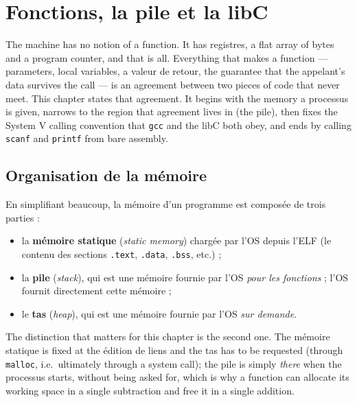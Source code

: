 \section{Fonctions, la pile et la libC}
The machine has no notion of a function. It has registres, a flat array of bytes
and a program counter, and that is all. Everything that makes a function ---
parameters, local variables, a valeur de retour, the guarantee that the
appelant's data survives the call --- is an agreement between two pieces of code
that never meet. This chapter states that agreement. It begins with the memory a
processus is given, narrows to the region that agreement lives in (the pile),
then fixes the System V calling convention that \texttt{gcc} and the libC both
obey, and ends by calling \texttt{scanf} and \texttt{printf} from bare assembly.

\subsection{Organisation de la mémoire}
\begin{definition}
  En simplifiant beaucoup, la mémoire d'un programme est composée de trois
  parties :
  \begin{itemize}
    \item la \textbf{mémoire statique} (\textit{static memory}) chargée par l'OS
      depuis l'ELF (le contenu des sections \texttt{.text}, \texttt{.data},
      \texttt{.bss}, etc.) ;
    \item la \textbf{pile} (\textit{stack}), qui est une mémoire fournie par
      l'OS \emph{pour les fonctions} ; l'OS fournit directement cette mémoire ;
    \item le \textbf{tas} (\textit{heap}), qui est une mémoire fournie par l'OS
      \emph{sur demande}.
  \end{itemize}
\end{definition}

The distinction that matters for this chapter is the second one. The mémoire
statique is fixed at the édition de liens and the tas has to be requested
(through \texttt{malloc}, i.e.\ ultimately through a system call); the pile is
simply \emph{there} when the processus starts, without being asked for, which is
why a function can allocate its working space in a single subtraction and free
it in a single addition.

